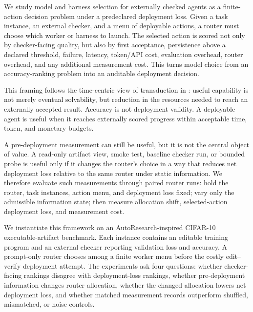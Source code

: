 \documentclass{article}
\begin{document}
We study model and harness selection for externally checked agents as a finite-action decision problem under a predeclared deployment loss.
Given a task instance, an external checker, and a menu of deployable actions, a router must choose which worker or harness to launch.
The selected action is scored not only by checker-facing quality, but also by first acceptance, persistence above a declared threshold, failure, latency, token/API cost, evaluation overhead, router overhead, and any additional measurement cost.
This turns model choice from an accuracy-ranking problem into an auditable deployment decision.

This framing follows the time-centric view of transduction in \citet{achille2025agents}: useful capability is not merely eventual solvability, but reduction in the resources needed to reach an externally accepted result.
Accuracy is not deployment validity.
A deployable agent is useful when it reaches externally scored progress within acceptable time, token, and monetary budgets.

A pre-deployment measurement can still be useful, but it is not the central object of value.
A read-only artifact view, smoke test, baseline checker run, or bounded probe is useful only if it changes the router's choice in a way that reduces net deployment loss relative to the same router under static information.
We therefore evaluate such measurements through paired router runs: hold the router, task instances, action menu, and deployment loss fixed; vary only the admissible information state; then measure allocation shift, selected-action deployment loss, and measurement cost.

We instantiate this framework on an AutoResearch-inspired CIFAR-10 executable-artifact benchmark.
Each instance contains an editable training program and an external checker reporting validation loss and accuracy.
A prompt-only router chooses among a finite worker menu before the costly edit--verify deployment attempt.
The experiments ask four questions: whether checker-facing rankings disagree with deployment-loss rankings, whether pre-deployment information changes router allocation, whether the changed allocation lowers net deployment loss, and whether matched measurement records outperform shuffled, mismatched, or noise controls.
\end{document}
